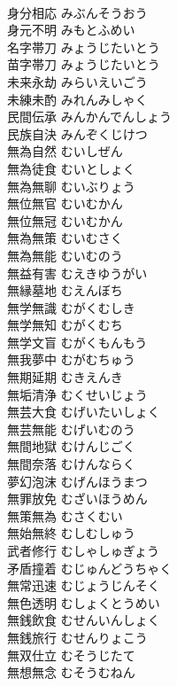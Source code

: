 \documentclass[8pt]{extreport}
\begin{document}
\begin{CJK}{UTF8}{min}
\\	身分相応	みぶんそうおう	
\\	身元不明	みもとふめい	
\\	名字帯刀	みょうじたいとう	
\\	苗字帯刀	みょうじたいとう	
\\	未来永劫	みらいえいごう	
\\	未練未酌	みれんみしゃく	
\\	民間伝承	みんかんでんしょう	
\\	民族自決	みんぞくじけつ	
\\	無為自然	むいしぜん	
\\	無為徒食	むいとしょく	
\\	無為無聊	むいぶりょう	
\\	無位無官	むいむかん	
\\	無位無冠	むいむかん	
\\	無為無策	むいむさく	
\\	無為無能	むいむのう	
\\	無益有害	むえきゆうがい	
\\	無縁墓地	むえんぼち	
\\	無学無識	むがくむしき	
\\	無学無知	むがくむち	
\\	無学文盲	むがくもんもう	
\\	無我夢中	むがむちゅう	
\\	無期延期	むきえんき	
\\	無垢清浄	むくせいじょう	
\\	無芸大食	むげいたいしょく	
\\	無芸無能	むげいむのう	
\\	無間地獄	むけんじごく	
\\	無間奈落	むけんならく	
\\	夢幻泡沫	むげんほうまつ	
\\	無罪放免	むざいほうめん	
\\	無策無為	むさくむい	
\\	無始無終	むしむしゅう	
\\	武者修行	むしゃしゅぎょう	
\\	矛盾撞着	むじゅんどうちゃく	
\\	無常迅速	むじょうじんそく	
\\	無色透明	むしょくとうめい	
\\	無銭飲食	むせんいんしょく	
\\	無銭旅行	むせんりょこう	
\\	無双仕立	むそうじたて	
\\	無想無念	むそうむねん	

\end{CJK}
\end{document}
